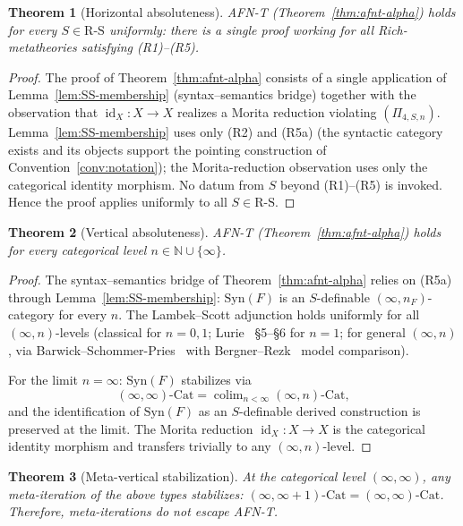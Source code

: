 \documentclass[11pt]{article}
\theoremstyle{plain}
\newtheorem{theorem}{Theorem}[section]
\theoremstyle{definition}
\newcommand{\RS}{\mathrm{R\text{-}S}}
\newcommand{\Cat}{\mathrm{Cat}}
\newcommand{\Syn}{\mathrm{Syn}}
\DeclareMathOperator{\colim}{colim}
\DeclareMathOperator{\id}{id}
\begin{document}
\begin{theorem}[Horizontal absoluteness]\label{thm:horizontal}
AFN-T (Theorem~\ref{thm:afnt-alpha}) holds for every $S \in \RS$ uniformly: there is a single proof working for all Rich-metatheories satisfying (R1)--(R5).
\end{theorem}

\begin{proof}
The proof of Theorem~\ref{thm:afnt-alpha} consists of a single application of Lemma~\ref{lem:SS-membership} (syntax--semantics bridge) together with the observation that $\id_X : X \to X$ realizes a Morita reduction violating $(\Pi_{4, S, n})$. Lemma~\ref{lem:SS-membership} uses only (R2) and (R5a) (the syntactic category exists and its objects support the pointing construction of Convention~\ref{conv:notation}); the Morita-reduction observation uses only the categorical identity morphism. No datum from $S$ beyond (R1)--(R5) is invoked. Hence the proof applies uniformly to all $S \in \RS$.
\end{proof}

\begin{theorem}[Vertical absoluteness]\label{thm:vertical}
AFN-T (Theorem~\ref{thm:afnt-alpha}) holds for every categorical level $n \in \mathbb{N} \cup \{\infty\}$.
\end{theorem}

\begin{proof}
The syntax--semantics bridge of Theorem~\ref{thm:afnt-alpha} relies on (R5a) through Lemma~\ref{lem:SS-membership}: $\Syn(F)$ is an $S$-definable $(\infty, n_F)$-category for every $n$. The Lambek--Scott adjunction holds uniformly for all $(\infty, n)$-levels (classical for $n = 0, 1$; Lurie~\cite{LurieHTT} \S 5--\S 6 for $n = 1$; for general $(\infty, n)$, via Barwick--Schommer-Pries~\cite{BarwickSchommerPries2021} with Bergner--Rezk~\cite{BergnerRezk2013} model comparison).

For the limit $n = \infty$: $\Syn(F)$ stabilizes via
\[ (\infty, \infty)\text{-}\Cat = \colim_{n < \infty} (\infty, n)\text{-}\Cat, \]
and the identification of $\Syn(F)$ as an $S$-definable derived construction is preserved at the limit. The Morita reduction $\id_X : X \to X$ is the categorical identity morphism and transfers trivially to any $(\infty, n)$-level.
\end{proof}

\begin{theorem}[Meta-vertical stabilization]\label{thm:meta-vertical}
At the categorical level $(\infty, \infty)$, any meta-iteration of the above types stabilizes: $(\infty, \infty + 1)\text{-}\Cat = (\infty, \infty)\text{-}\Cat$. Therefore, meta-iterations do not escape AFN-T.
\end{theorem}
\end{document}
